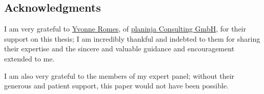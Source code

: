 \subsection{Acknowledgments}

I am very grateful to \href{https://www.linkedin.com/in/yvonne-romes/}{Yvonne Romes}, of \href{https://www.planinja.de/}{planinja Consulting GmbH}, for their support on this thesis; I am incredibly thankful and indebted to them for sharing their expertise and the sincere and valuable guidance and encouragement extended to me.

I am also very grateful to the members of my expert panel; without their generous and patient support, this paper would not have been possible.
